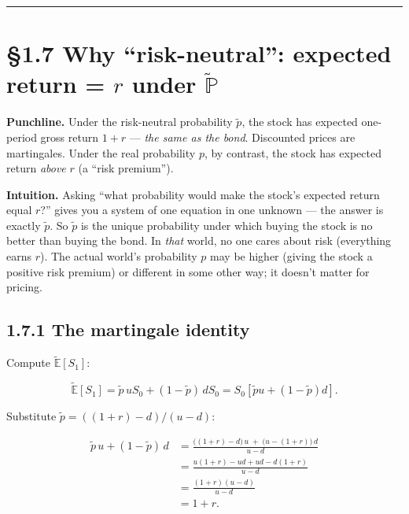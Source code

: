\documentclass[
  10pt,
  twoside]{book}
\begin{document}
\begin{center}\rule{0.5\linewidth}{0.5pt}\end{center}

\section{\texorpdfstring{§1.7 Why ``risk-neutral'': expected return =
\(r\) under
\(\tilde{\mathbb P}\)}{§1.7 Why ``risk-neutral'': expected return = r under \textbackslash tilde\{\textbackslash mathbb P\}}}\label{why-risk-neutral-expected-return-r-under-tildemathbb-p}

\textbf{Punchline.} Under the risk-neutral probability \(\tilde p\), the
stock has expected one-period gross return \(1+r\) --- \emph{the same as
the bond}. Discounted prices are martingales. Under the real probability
\(p\), by contrast, the stock has expected return \emph{above} \(r\) (a
``risk premium'').

\textbf{Intuition.} Asking ``what probability would make the stock's
expected return equal \(r\)?'' gives you a system of one equation in one
unknown --- the answer is exactly \(\tilde p\). So \(\tilde p\) is the
unique probability under which buying the stock is no better than buying
the bond. In \emph{that} world, no one cares about risk (everything
earns \(r\)). The actual world's probability \(p\) may be higher (giving
the stock a positive risk premium) or different in some other way; it
doesn't matter for pricing.

\subsection{1.7.1 The martingale
identity}\label{the-martingale-identity}

Compute \(\widetilde{\mathbb E}[S_1]\):

\[\widetilde{\mathbb E}[S_1] = \tilde p\, uS_0 + (1-\tilde p)\, dS_0 = S_0[\tilde p u + (1-\tilde p)d].\]

Substitute \(\tilde p = ((1+r)-d)/(u-d)\):

\[
\begin{aligned}
\tilde p\, u + (1-\tilde p)\, d
&= \frac{\bigl((1+r) - d\bigr)\,u \;+\; \bigl(u - (1+r)\bigr)\,d}{u-d} \\
&= \frac{u(1+r) - ud + ud - d(1+r)}{u-d} \\
&= \frac{(1+r)(u-d)}{u-d} \\
&= 1+r.
\end{aligned}
\]
\end{document}

